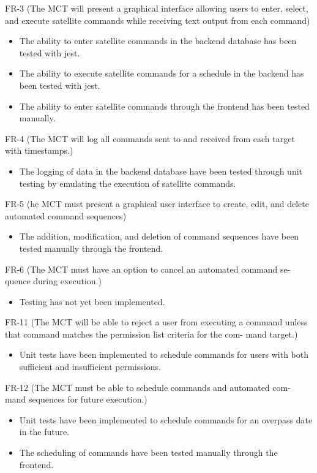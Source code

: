 \documentclass[12pt, titlepage]{article}
\begin{document}
FR-3 (The MCT will present a graphical interface allowing users to enter, select, and execute satellite commands while receiving text output from each command)
\begin{itemize}
    \item The ability to enter satellite commands in the backend database has been tested with jest.
    \item The ability to execute satellite commands for a schedule in the backend has been tested with jest.
    \item The ability to enter satellite commands through the frontend has been tested manually.
\end{itemize}

FR-4 (The MCT will log all commands sent to and received from each target
with timestamps.)
\begin{itemize}
    \item The logging of data in the backend database have been tested through unit testing by emulating the execution of satellite commands.
\end{itemize}

FR-5 (he MCT must present a graphical user interface to create, edit, and
delete automated command sequences)
\begin{itemize}
    \item The addition, modification, and deletion of command sequences have been tested manually through the frontend.
\end{itemize}

FR-6 (The MCT must have an option to cancel an automated command se-
quence during execution.)
\begin{itemize}
    \item Testing has not yet been implemented.
\end{itemize}

FR-11 (The MCT will be able to reject a user from executing a command
unless that command matches the permission list criteria for the com-
mand target.)
\begin{itemize}
    \item Unit tests have been implemented to schedule commands for users with both sufficient and insufficient permissions.
\end{itemize}

FR-12 (The MCT must be able to schedule commands and automated com-
mand sequences for future execution.)
\begin{itemize}
    \item Unit tests have been implemented to schedule commands for an overpass date in the future.
    \item The scheduling of commands have been tested manually through the frontend.
\end{itemize}
\end{document}
